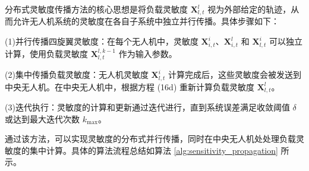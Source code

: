 \documentclass[lang=chs, degree=master, blindreview=false, winfonts=true]{yanputhesis}
\begin{document}

分布式灵敏度传播方法的核心思想是将负载灵敏度 $\mathbf{X}_{l,t}^l$ 视为外部给定的轨迹，从而允许无人机系统的灵敏度在各自子系统中独立并行传播。具体步骤如下：

(1)并行传播四旋翼灵敏度：在每个无人机中，灵敏度 $\mathbf{X}_{i,t}^i$、$\mathbf{X}_{i,t}^l$ 和 $\mathbf{X}_{l,t}^i$ 可以独立计算，使用负载灵敏度 $\mathbf{X}_{l,t}^{l,k-1}$ 作为输入参数。

(2)集中传播负载灵敏度：无人机灵敏度 $\mathbf{X}_{l,t}^i$ 计算完成后，这些灵敏度会被发送到中央无人机。在中央无人机中，根据方程 (16d) 重新计算负载灵敏度 $\mathbf{X}_{l,t}^l$。

(3)迭代执行：灵敏度的计算和更新通过迭代进行，直到系统误差满足收敛阈值 $\delta$ 或达到最大迭代次数 $k_{\text{max}}$。


通过该方法，可以实现灵敏度的分布式并行传播，同时在中央无人机处处理负载灵敏度的集中计算。具体的算法流程总结如算法 \ref{alg:sensitivity_propagation} 所示。
\end{document}
